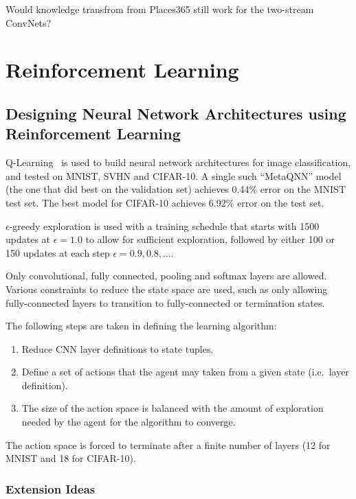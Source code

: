 \documentclass[a4paper, 12pt]{article}
\begin{document}
Would knowledge transfrom from Places365 still work for the two-stream
ConvNets?


\section{Reinforcement Learning}


\subsection{Designing Neural Network Architectures using Reinforcement
            Learning~\citet{DBLP:journals/corr/BakerGNR16}}

Q-Learning~\citet{Watkins1992} is used to build neural network architectures for
image classification, and tested on MNIST, SVHN and CIFAR-10. A single such
``MetaQNN'' model (the one that did best on the validation set) achieves 0.44\%
error on the MNIST test set. The best model for CIFAR-10 achieves 6.92\% error
on the test set.

$\epsilon$-greedy exploration is used with a training schedule that starts with
\num{1500} updates at $\epsilon = 1.0$ to allow for sufficient exploration,
followed by either \num{100} or \num{150} updates at each step
$\epsilon = 0.9, 0.8, \dots$.

Only convolutional, fully connected, pooling and softmax layers are allowed.
Various constraints to reduce the state space are used, such as only allowing
fully-connected layers to transition to fully-connected or termination states.

The following steps are taken in defining the learning algorithm:

\begin{enumerate}
        \item Reduce CNN layer definitions to state tuples.

        \item Define a set of actions that the agent may taken from a given
                state (i.e.\ layer definition).

        \item The size of the action space is balanced with the amount of
                exploration needed by the agent for the algorithm to converge.
\end{enumerate}

The action space is forced to terminate after a finite number of layers (12 for
MNIST and 18 for CIFAR-10).

\subsubsection{Extension Ideas}
\end{document}
